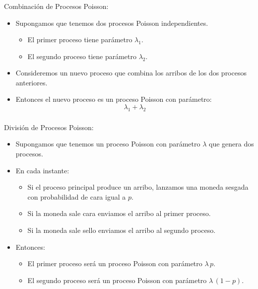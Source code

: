 \documentclass[ 10pt, xcolor = dvipsnames]{beamer}
\begin{document}
\begin{frame}[allowframebreaks]
\frametitle{\insertsection}

Combinaci\'on de Procesos Poisson: 
\begin{itemize}
\item Supongamos que tenemos dos procesos Poisson independientes. 
\begin{itemize}
\item El primer proceso tiene par\'ametro $\lambda_1$.
\item El segundo proceso tiene par\'ametro $\lambda_2$.
\end{itemize}
\item Consideremos un nuevo proceso que combina los arribos de los dos \linebreak procesos anteriores.
\item Entonces el nuevo proceso es un proceso Poisson con par\'ametro:
\[
\lambda_1 + \lambda_2
\]
\end{itemize}

\end{frame}

\begin{frame}[allowframebreaks]
\frametitle{\insertsection}

Divisi\'on de Procesos Poisson: 
\begin{itemize}
\item Supongamos que tenemos un proceso Poisson con par\'ametro $\lambda$ que genera dos procesos. 
\item En cada instante: 
\begin{itemize}
\item Si el proceso principal produce un arribo, lanzamos una moneda sesgada con probabilidad de cara igual a $p$. 
\item Si la moneda sale cara enviamos el arribo al primer proceso. 
\item Si la moneda sale sello enviamos el arribo al segundo proceso. 
\end{itemize}
\item Entonces: 
\begin{itemize}
\item El primer proceso ser\'a un proceso Poisson con par\'ametro $\lambda \, p$. 
\item El segundo proceso ser\'a un proceso Poisson con par\'ametro $\lambda \, (1-p)$. 
\end{itemize}
\end{itemize}

\end{frame}
\end{document}
